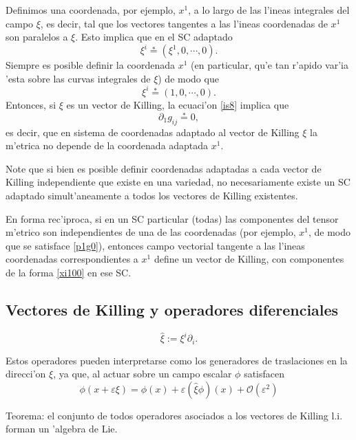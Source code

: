 Definimos una coordenada, por ejemplo, $x^1$, a lo largo de las l'ineas integrales del campo $\xi$, es decir, tal que los vectores tangentes a las l'ineas coordenadas de $x^1$ son paralelos a $\xi$. Esto implica que en el SC adaptado 
\begin{equation}
\xi^i\stackrel{*}{=}(\xi^1,0,\cdots,0).
\end{equation}
Siempre es posible definir la coordenada $x^1$ (en particular, qu'e tan r'apido var'ia 'esta sobre las curvas integrales de $\xi$) de modo que
\begin{equation}\label{xi100}
\xi^i\stackrel{*}{=}(1,0,\cdots,0).
\end{equation}
Entonces, si $\xi$ es un vector de Killing, la ecuaci'on \eqref{is8} implica que
\begin{equation}\label{p1g0}
\partial_1g_{ij}\stackrel{*}{=}0,
\end{equation}
es decir, que en sistema de coordenadas adaptado al vector de Killing $\xi$ la m'etrica no depende de la coordenada adaptada $x^1$.

Note que si bien es posible definir coordenadas adaptadas a cada vector de Killing independiente que existe en una variedad, no necesariamente existe un SC adaptado simult'aneamente a todos los vectores de Killing existentes.

En forma rec'iproca, si en un SC particular (todas) las componentes del tensor m'etrico son independientes de una de las coordenadas (por ejemplo, $x^1$, de modo que se satisface \eqref{p1g0}), entonces campo vectorial tangente a las l'ineas coordenadas correspondientes a $x^1$ define un vector de Killing, con componentes de la forma \eqref{xi100} en ese SC.

\subsection{Vectores de Killing y operadores diferenciales}
\begin{equation}
\hat{\xi}:=\xi^i\partial_i.
\end{equation}

Estos operadores pueden interpretarse como los generadores de traslaciones en la direcci'on $\xi$, ya que, al actuar sobre un campo escalar $\phi$ satisfacen
\begin{equation}
\phi(x+\varepsilon\xi) = \phi(x) + \varepsilon(\hat{\xi}\phi)(x) + \mathcal{O}(\varepsilon^2)
\end{equation}

Teorema: el conjunto de todos operadores asociados a los vectores de Killing l.i. forman un 'algebra de Lie.

